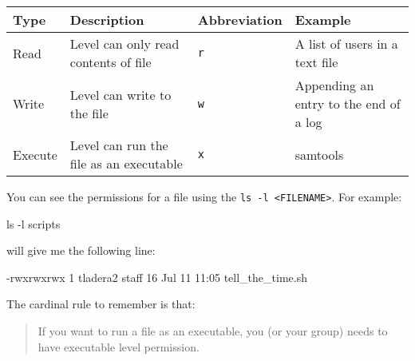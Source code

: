 \documentclass[
  letterpaper,
  DIV=11,
  numbers=noendperiod]{scrreprt}
\newenvironment{Shaded}{\begin{snugshade}}{\end{snugshade}}
\newcommand{\AttributeTok}[1]{\textcolor[rgb]{0.40,0.45,0.13}{#1}}
\newcommand{\ExtensionTok}[1]{\textcolor[rgb]{0.00,0.23,0.31}{#1}}
\newcommand{\FunctionTok}[1]{\textcolor[rgb]{0.28,0.35,0.67}{#1}}
\newcommand{\NormalTok}[1]{\textcolor[rgb]{0.00,0.23,0.31}{#1}}
\begin{document}
\begin{longtable}[]{@{}
  >{\raggedright\arraybackslash}p{}
  >{\raggedright\arraybackslash}p{}
  >{\raggedright\arraybackslash}p{}
  >{\raggedright\arraybackslash}p{}@{}}
\toprule\noalign{}
\begin{minipage}[b]{\linewidth}\raggedright
Type
\end{minipage} & \begin{minipage}[b]{\linewidth}\raggedright
Description
\end{minipage} & \begin{minipage}[b]{\linewidth}\raggedright
Abbreviation
\end{minipage} & \begin{minipage}[b]{\linewidth}\raggedright
Example
\end{minipage} \\
\midrule\noalign{}
\endhead
\bottomrule\noalign{}
\endlastfoot
Read & Level can only read contents of file & \texttt{r} & A list of
users in a text file \\
Write & Level can write to the file & \texttt{w} & Appending an entry to
the end of a log \\
Execute & Level can run the file as an executable & \texttt{x} &
samtools \\
\end{longtable}

You can see the permissions for a file using the
\texttt{ls\ -l\ \textless{}FILENAME\textgreater{}}. For example:

\begin{Shaded}
\begin{Highlighting}[]
\FunctionTok{ls} \AttributeTok{{-}l}\NormalTok{ scripts}
\end{Highlighting}
\end{Shaded}

will give me the following line:

\begin{Shaded}
\begin{Highlighting}[]
\ExtensionTok{{-}rwxrwxrwx}\NormalTok{ 1 tladera2  staff  16 Jul 11 11:05 tell\_the\_time.sh}
\end{Highlighting}
\end{Shaded}

The cardinal rule to remember is that:

\begin{quote}
If you want to run a file as an executable, you (or your group) needs to
have executable level permission.
\end{quote}
\end{document}

